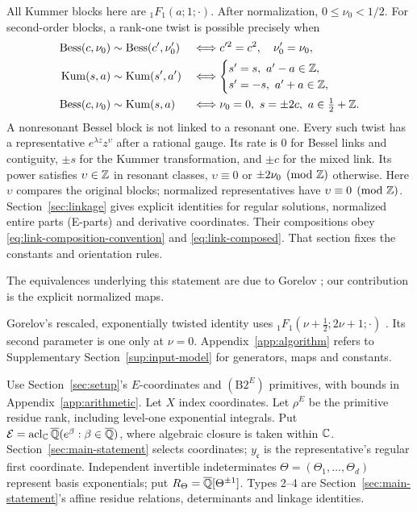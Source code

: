 \begin{theorem}\label{thm:linkage}
All Kummer blocks here are ${}_1F_1(a;1;\cdot)$.
After normalization, $0\leq\nu_0<1/2$. For second-order blocks, a rank-one
twist is possible precisely when
\begin{align}
 \operatorname{Bess}(c,\nu_0)&\sim\operatorname{Bess}(c',\nu'_0)
 &&\Longleftrightarrow c'^2=c^2,\quad\nu'_0=\nu_0,\label{eq:link-bb}\\
 \operatorname{Kum}(s,a)&\sim\operatorname{Kum}(s',a')
 &&\Longleftrightarrow
 \begin{cases}s'=s,\ a'-a\in\Z,\\s'=-s,\ a'+a\in\Z,\end{cases}\label{eq:link-kk}\\
 \operatorname{Bess}(c,\nu_0)&\sim\operatorname{Kum}(s,a)
 &&\Longleftrightarrow\nu_0=0,\ s=\pm2c,\ a\in\tfrac12+\Z.\label{eq:link-bk}
\end{align}
A nonresonant Bessel block is not linked to a resonant one. Every such
twist has a representative $e^{\lambda z}z^\upsilon$ after a rational gauge.
Its rate is $0$ for Bessel links
and contiguity, $\pm s$ for the Kummer transformation, and $\pm c$
for the mixed link. Its power satisfies $\upsilon\in\mathbb{Z}$ in resonant
classes, $\upsilon\equiv0$ or $\pm2\nu_0\pmod{\mathbb{Z}}$ otherwise. Here $\upsilon$
compares the original blocks; normalized representatives have
$\upsilon\equiv0\pmod{\mathbb{Z}}$.
Section~\ref{sec:linkage} gives explicit identities for regular solutions,
normalized entire parts (E-parts) and derivative coordinates.
Their compositions obey \eqref{eq:link-composition-convention} and
\eqref{eq:link-composed}. That section fixes the constants and orientation rules.
\end{theorem}
The equivalences underlying this statement are due to Gorelov
\cite[Lemmas~12 and~14, p.~7]{Gorelov2021}; our contribution is the explicit
normalized maps.

Gorelov's rescaled, exponentially twisted identity uses
${}_1F_1(\nu+\tfrac12;2\nu+1;\cdot)$ \cite[(3), p.~260]{Gorelov2019}.
Its second parameter is one only at $\nu=0$.
Appendix~\ref{app:algorithm} refers to Supplementary Section~\ref{sup:input-model}
for generators, maps and constants.

Use Section~\ref{sec:setup}'s $E$-coordinates and $(\mathrm{B2}^E)$ primitives,
with bounds in Appendix~\ref{app:arithmetic}. Let $X$ index coordinates.
Let $\rho^E$ be the primitive residue rank, including level-one exponential integrals. Put
$\mathcal E=\operatorname{acl}_{\mathbb{C}}{\overline{\mathbb{Q}}}(e^\beta:\beta\in{\overline{\mathbb{Q}}})$,
where algebraic closure is taken within $\mathbb{C}$.
Section~\ref{sec:main-statement} selects coordinates; $y_{\mathfrak c}$ is
the representative's regular first coordinate.
Independent invertible indeterminates $\Theta=(\Theta_1,\ldots,\Theta_d)$
represent basis exponentials; put $R_\Theta={\overline{\mathbb{Q}}}[\Theta^{\pm1}]$.
Types 2--4 are Section~\ref{sec:main-statement}'s affine residue relations,
determinants and linkage identities.

